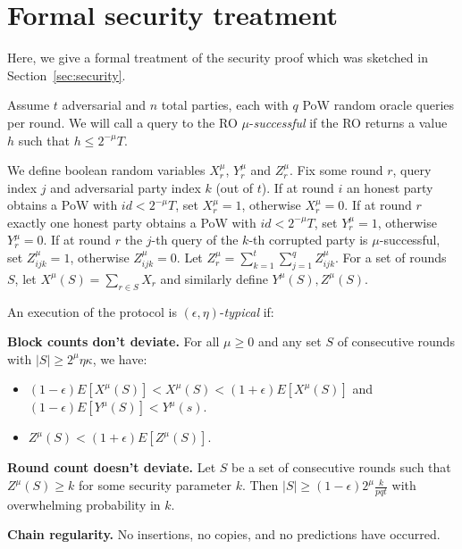\section{Formal security treatment}
\label{sec:security-full}

Here, we give a formal treatment of the security proof which was sketched in
Section~\ref{sec:security}.

Assume $t$ adversarial and $n$ total parties, each with $q$
PoW random oracle queries per round. We will call a query to the
RO $\mu$-\textit{successful} if the RO returns a value $h$
such that $h \leq 2^{-\mu}T$.

We define boolean random variables $X_r^\mu$, $Y_r^\mu$ and $Z_r^\mu$. Fix some
round $r$, query index $j$ and adversarial party index $k$ (out of $t$). If at
round $i$ an honest party obtains a PoW with $id < 2^{-\mu}T$, set $X_r^\mu =
1$, otherwise $X_r^\mu = 0$. If at round $r$ exactly one honest party obtains a
PoW with $id < 2^{-\mu}T$, set $Y_r^\mu = 1$, otherwise $Y_r^\mu = 0$. If at
round $r$ the $j$-th query of the $k$-th corrupted party is $\mu$-successful,
set $Z^\mu_{ijk} = 1$, otherwise $Z^\mu_{ijk} = 0$. Let $Z^\mu_r = \sum_{k=1}^t
\sum_{j=1}^q Z^\mu_{ijk}$. For a set of rounds $S$, let $X^\mu(S) = \sum_{r \in
S} X_r$ and similarly define $Y^\mu(S), Z^\mu(S)$.

\begin{definition}
    An execution of the protocol is $(\epsilon, \eta)$-\textit{typical} if:

    \textnormal{\bf Block counts don't deviate.}
    For all $\mu \geq 0$ and any set $S$ of consecutive rounds
    with $|S| \geq 2^\mu \eta\kappa$, we have:

    \begin{itemize}
        \item $(1 - \epsilon)E[X^\mu(S)] < X^\mu(S) < (1 + \epsilon)E[X^\mu(S)]$ and $(1 - \epsilon)E[Y^\mu(S)] < Y^\mu(s)$.
        \item $Z^\mu(S) < (1 + \epsilon)E[Z^\mu(S)]$.
    \end{itemize}

    \textnormal{\bf Round count doesn't deviate.}
    Let $S$ be a set of consecutive rounds such that $Z^\mu(S)
    \geq k$ for some security parameter $k$. Then $|S| \geq (1 -
    \epsilon)2^\mu\frac{k}{pqt}$ with overwhelming probability in $k$.

    \textnormal{\bf Chain regularity.}
    No insertions, no copies, and no predictions \cite{backbone} have occurred.
\end{definition}

